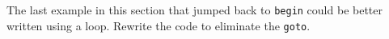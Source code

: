 %
%
\begin{question}
The last example in this section that jumped back to \verb|begin|
could be better written using a loop. Rewrite the code to eliminate the \verb|goto|.
\end{question}
